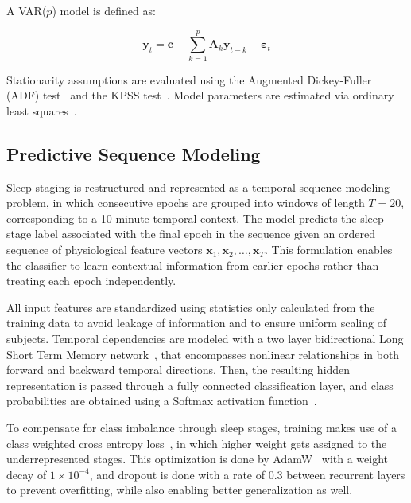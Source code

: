 \documentclass[10pt]{cai26}
\begin{document}
A VAR($p$) model is defined as:

\begin{equation}
\mathbf{y}_t = \mathbf{c} + \sum_{k=1}^{p} \mathbf{A}_k \mathbf{y}_{t-k} + \boldsymbol{\varepsilon}_t
\end{equation}

Stationarity assumptions are evaluated using the Augmented Dickey-Fuller (ADF) test~\cite{DickeyFuller1979ADF} and the KPSS test~\cite{Kwiatkowski1992KPSS}. Model parameters are estimated via ordinary 
least squares~\cite{Lutkepohl2005VAR}.

\subsection{Predictive Sequence Modeling}

Sleep staging is restructured and represented as a temporal sequence modeling problem, in which consecutive epochs are grouped 
into windows of length $T = 20$, corresponding to a 10 minute temporal context. The model predicts the sleep stage label 
associated with the final epoch in the sequence given an ordered sequence of physiological feature vectors 
${\mathbf{x}_1, \mathbf{x}_2, \ldots, \mathbf{x}_T}$. This formulation enables the classifier to learn contextual 
information from earlier epochs rather than treating each epoch independently. 

All input features are standardized using statistics only calculated from the training data to avoid leakage of information and 
to ensure uniform scaling of subjects. Temporal dependencies are modeled with a two layer bidirectional Long Short Term Memory 
network~\cite{Hochreiter1997LSTM,Schuster1997BiLSTM}, that encompasses nonlinear relationships in both forward and backward temporal directions. Then, the resulting 
hidden representation is passed through a fully connected classification layer, and class probabilities are obtained using a 
Softmax activation function~\cite{Goodfellow2016DeepLearning}. 

To compensate for class imbalance through sleep stages, training makes use of a class weighted cross entropy loss~\cite{Goodfellow2016DeepLearning}, in 
which higher weight gets assigned to the underrepresented stages. This optimization is done by AdamW~\cite{Loshchilov2019AdamW} with a weight 
decay of $1 \times 10^{-4}$, and dropout is done with a rate of 0.3 between recurrent layers to prevent overfitting, while also 
enabling better generalization as well.
\end{document}
